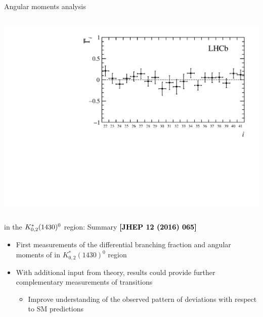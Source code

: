 \documentclass[aspectratio=1610]{beamer}
\def\Kstarfourteenthirty  {{\ensuremath{\kaon^{*}_{0,2}(1430)^{0}}}\xspace}
\begin{document}
\begin{frame}{Angular moments analysis}
\begin{columns}
\begin{column}{0.45\textwidth}
\includegraphics[height=0.44\textheight]{figs/kpimm/angular-analysis/mom_results_22_41.pdf}
\end{column}
\end{columns}
\end{frame}

\begin{frame}{\BdToKpimm in the \Kstarfourteenthirty region: Summary \hspace{0pt plus 1 filll} {\small \bf \textcolor{black}{[JHEP 12 (2016) 065]}}}

\begin{overlayarea}{\textwidth}{0.8\textheight}

\bigskip

\begin{itemize}
  \item[\ding{80}] First measurements of the differential branching fraction and angular moments of \BdToKpimm in $K^{*}_{0,2}(1430)^{0}$ region
  \item[\ding{80}] With additional input from theory, results could provide further complementary measurements of \btosll transitions
  \begin{itemize}
    \item[\ding{70}] Improve understanding of the observed pattern of deviations with respect to SM predictions
  \end{itemize}
\end{itemize}

\bigskip

\end{overlayarea}
\end{frame}
\end{document}
